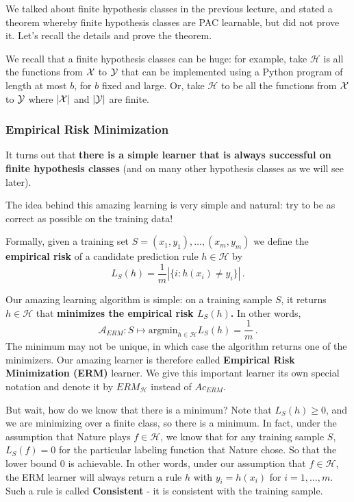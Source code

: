 \documentclass[11pt]{article}
\newcommand{\Ac}{\mathcal{A}}
\newcommand{\Hc}{\mathcal{H}}
\begin{document}
We talked about finite hypothesis classes in the previous lecture, and stated a
theorem whereby finite hypothesis classes are PAC learnable, but did not
prove it. Let's recall the details and prove the theorem.

We recall that a finite hypothesis classes can be huge: for example, take $\Hc$ is all the functions from $\mathcal{X}$ to $\mathcal{Y}$ that can be implemented using a Python program of length at most $b$, for $b$ fixed and large. Or, take $\Hc$ to be all the functions from $\mathcal{X}$ to $\mathcal{Y}$ where  $|\mathcal{X}|$ and $|\mathcal{Y}|$ are finite.

\subsubsection{Empirical Risk Minimization}

It turns out that {\bf there is a simple learner that is always successful on finite hypothesis classes} (and on many other hypothesis classes as we will see later).

The idea behind this amazing learning is very simple and natural: try to be as correct as possible on the training data!

Formally, given  a training set $S = (x_1,y_1),\ldots,(x_m,y_m)$ we define the {\bf empirical risk} of a candidate prediction rule $h\in\Hc$ by
$$L_S(h) = \frac{1}{m} |\{i : h(x_i)  \neq y_i\}|\,.$$

Our amazing learning algorithm is simple: on a training sample $S$, it returns $h \in \Hc$ that {\bf minimizes the empirical risk $L_S(h)$.} In other words,
\[
\Ac_{ERM} : S \mapsto \text{argmin}_{h\in\Hc} L_S(h) = \frac{1}{m} \,.
\]
The minimum may not be unique, in which case the algorithm returns one of the minimizers. Our amazing learner is therefore called \textbf{Empirical Risk Minimization (ERM)} learner. We give this important learner its own special notation and denote it by $ERM_\Hc$ instead of $Ac_{ERM}$.

But wait, how do we know that there is a minimum?  Note that $L_S(h)\geq 0$, and we are minimizing over a finite class, so there is a minimum. In fact, under the assumption that Nature plays $f\in\Hc$, we know that for any training sample $S$,  $L_S(f) = 0$ for the particular labeling function that Nature chose. So that the lower bound $0$ is achievable. In other words, under our assumption that $f\in\Hc$, the ERM learner will always return a rule  $h$ with $y_i = h(x_i)$ for $i=1,\ldots,m$. 
Such a rule is called \textbf{Consistent} - it is consistent with the training sample. 
\end{document}
